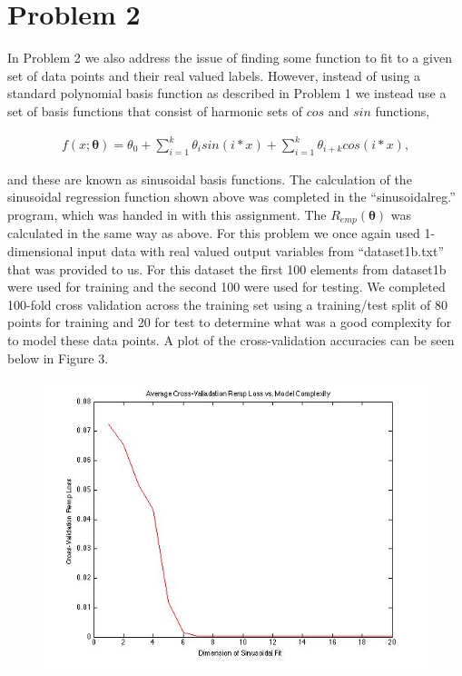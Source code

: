 \documentclass[paper=a4, fontsize=11pt]{scrartcl} %
\numberwithin{equation}{section} %
\numberwithin{figure}{section} %
\numberwithin{table}{section} %
\begin{document}
\section{Problem 2}

In Problem 2 we also address the issue of finding some function to fit to a given set of data points and their real valued labels.  However, instead of using a standard polynomial basis function as described in Problem 1 we instead use a set of basis functions that consist of harmonic sets of $cos$ and $sin$ functions, 

\begin{align}
f(x;\bm{\theta}) = \theta_{0} +\sum\limits_{i=1}^k \theta_{i}sin(i*x) + \sum\limits_{i=1}^k \theta_{i+k}cos(i*x),
\end{align}

and these are known as sinusoidal basis functions.
The calculation of the sinusoidal regression function shown above was completed in the  ``sinusoidalreg.'' program, which was handed in with this assignment.  
The $R_{emp}(\bm{\theta})$ was calculated in the same way as above.
For this problem we once again used 1-dimensional input data with real valued output variables from ``dataset1b.txt'' that was provided to us.
For this dataset the first 100 elements from dataset1b were used for training and the second 100 were used for testing.
We completed 100-fold cross validation across the training set using a training/test split of 80 points for training and 20 for test to determine what was a good complexity for to model these data points.
A plot of the cross-validation accuracies can be seen below in Figure 3.

\begin{figure}
\centering
\includegraphics[scale=0.4]{Prob2_CrossValError.jpg}
\end{figure}
\end{document}
